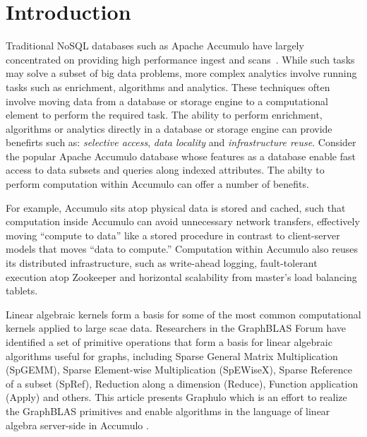 
\section{Introduction}
\label{sIntro}
% 


Traditional NoSQL databases such as Apache Accumulo have largely
concentrated on providing high performance ingest and
scans~\cite{sen2013benchmarking}. While such tasks may solve a subset
of big data problems, more complex analytics involve running tasks
such as enrichment, algorithms and analytics. These techniques
often involve moving data from a database or storage engine to a
computational element to perform the required task. The ability to
perform enrichment, algorithms or analytics directly in a database or
storage engine can provide benefirts such as: \emph{selective access},
\emph{data locality} and \emph{infrastructure reuse}. Consider the
popular Apache Accumulo database whose features as a database enable
fast access to data subsets and queries along indexed attributes. The
abilty to perform computation within Accumulo can offer a number of
benefits. 


For example, Accumulo sits atop physical data is stored and cached, such that computation inside
Accumulo can avoid unnecessary network transfers,
effectively moving ``compute to data'' like a stored procedure
in contrast to client-server models that moves ``data to compute.''
Computation within Accumulo also reuses its distributed infrastructure, 
such as write-ahead logging, fault-tolerant execution atop Zookeeper and 
horizontal scalability from master's load balancing tablets.

Linear algebraic kernels form a basis for some of the most common
computational kernels applied to large scae data. Researchers in the GraphBLAS Forum \cite{mattson2014standards} have identified a set of primitive operations 
that form a basis for linear algebraic algorithms useful for graphs, including 
Sparse General Matrix Multiplication (SpGEMM),  Sparse Element-wise Multiplication (SpEWiseX),
Sparse Reference of a subset (SpRef), Reduction along a dimension (Reduce),
Function application (Apply) and others.
This article presents Graphulo which is an effort to realize the GraphBLAS primitives 
and enable algorithms in the language of linear algebra server-side in Accumulo \cite{gadepally2015gabb}.

